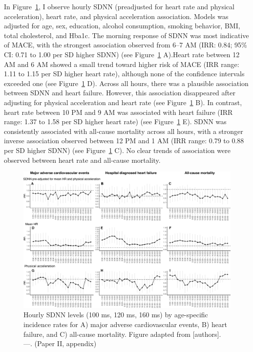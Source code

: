 \documentclass[
  a4paper,
  headsepline=true,
  open=any]{scrbook}
\begin{document}
In Figure~\ref{fig-ADD_PRO_risk_by_hour}, I observe hourly SDNN
(preadjusted for heart rate and physical acceleration), heart rate, and
physical acceleration association. Models was adjusted for age, sex,
education, alcohol consumption, smoking behavior, BMI, total
cholesterol, and Hba1c. The morning response of SDNN was most indicative
of MACE, with the strongest association observed from 6--7 AM (IRR:
0.84; 95\% CI: 0.71 to 1.00 per SD higher SDNN) (see
Figure~\ref{fig-ADD_PRO_risk_by_hour} A).Heart rate between 12 AM and 6
AM showed a small trend toward higher risk of MACE (IRR range: 1.11 to
1.15 per SD higher heart rate), although none of the confidence
intervals exceeded one (see Figure~\ref{fig-ADD_PRO_risk_by_hour} D).
Across all hours, there was a plausible association between SDNN and
heart failure. However, this association disappeared after adjusting for
physical acceleration and heart rate (see
Figure~\ref{fig-ADD_PRO_risk_by_hour} B). In contrast, heart rate
between 10 PM and 9 AM was associated with heart failure (IRR range:
1.37 to 1.58 per SD higher heart rate) (see
Figure~\ref{fig-ADD_PRO_risk_by_hour} E). SDNN was consistently
associated with all-cause mortality across all hours, with a stronger
inverse association observed between 12 PM and 1 AM (IRR range: 0.79 to
0.88 per SD higher SDNN) (see Figure~\ref{fig-ADD_PRO_risk_by_hour} C).
No clear trends of association were observed between heart rate and
all-cause mortality.

\begin{figure}

{\centering \includegraphics{images/figure_ADD_PRO_risk_by_hour.pdf}

}

\caption{\label{fig-ADD_PRO_risk_by_hour}Hourly SDNN levels (100 ms, 120
ms, 160 ms) by age-specific incidence rates for A) major adverse
cardiovascular events, B) heart failure, and C) all-cause mortality.
Figure adapted from {[}authors{]}. ---. (Paper II, appendix)}

\end{figure}
\end{document}
